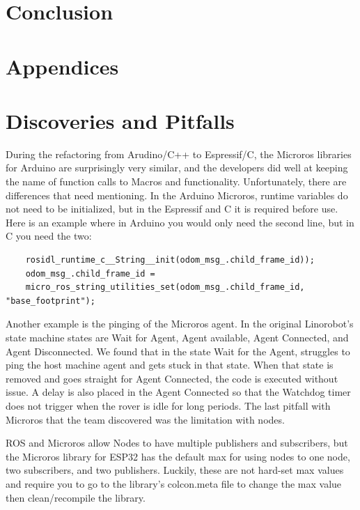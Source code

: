 \documentclass[conference]{IEEEtran}
\begin{document}
\section{Conclusion}

\section{Appendices}

\section{Discoveries and Pitfalls}  
During the refactoring from Arudino/C++ to Espressif/C, the Microros libraries for Arduino are surprisingly very similar, and the developers did well at keeping the name of function calls to Macros and functionality. Unfortunately, there are differences that need mentioning. In the Arduino Microros, runtime variables do not need to be initialized, but in the Espressif and C it is required before use. Here is an example where in Arduino you would only need the second line, but in C you need the two:

\begingroup
\fontsize{5.70pt}{10pt}\selectfont
\begin{verbatim}  
	rosidl_runtime_c__String__init(odom_msg_.child_frame_id));
	odom_msg_.child_frame_id = 
	micro_ros_string_utilities_set(odom_msg_.child_frame_id, "base_footprint");  
\end{verbatim}  
\endgroup

Another example is the pinging of the Microros agent. In the original Linorobot's state machine states are Wait for Agent, Agent available, Agent Connected, and Agent Disconnected. We found that in the state Wait for the Agent, struggles to ping the host machine agent and gets stuck in that state. When that state is removed and goes straight for Agent Connected, the code is executed without issue. A delay is also placed in the Agent Connected so that the Watchdog timer does not trigger when the rover is idle for long periods. The last pitfall with Microros that the team discovered was the limitation with nodes.

 ROS and Microros allow Nodes to have multiple publishers and subscribers, but the Microros library for ESP32 has the default max for using nodes to one node, two subscribers, and two publishers. Luckily, these are not hard-set max values and require you to go to the library’s colcon.meta file to change the max value then clean/recompile the library.
 
\end{document}
